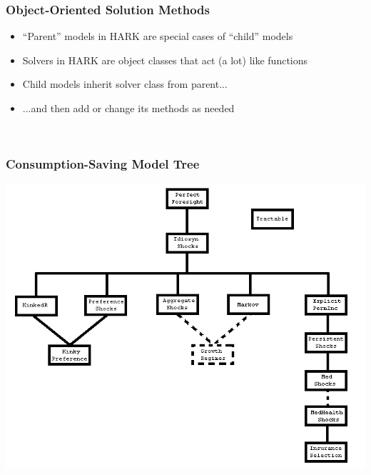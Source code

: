 \documentclass{beamer}
\begin{document}
\begin{frame}
  \frametitle{Object-Oriented Solution Methods}
  \begin{itemize}
  \item ``Parent'' models in HARK are special cases of ``child'' models

  \item Solvers in HARK are object classes that act (a lot) like functions

  \item Child models inherit solver class from parent...
    
  \item ...and then add or change its methods as needed
  \end{itemize}
\end{frame}


\begin{frame}\
  \frametitle{Consumption-Saving Model Tree}
  \begin{center}
    \includegraphics[scale=0.5]{NamesModelTree.png}
  \end{center}
\end{frame}
\end{document}
